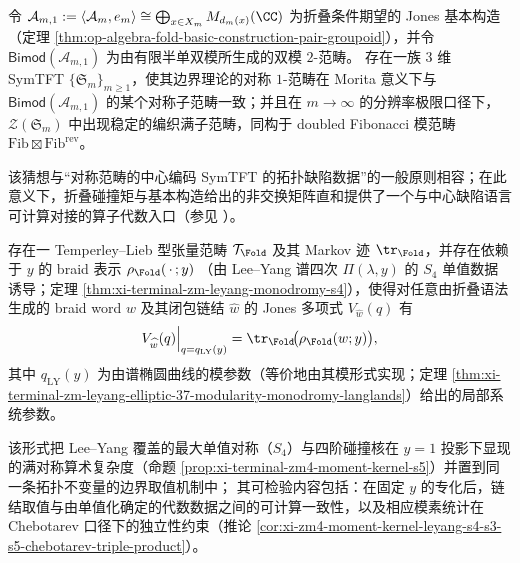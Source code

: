 \begin{conjecture}\label{conj:pom-fold-jones-tower-symtft-doubled-fib}
令 \(\mathcal A_{m,1}:=\langle \mathcal A_m,e_m\rangle\cong \bigoplus_{x\in X_m}M_{d_m(x)}(\CC)\) 为折叠条件期望的 Jones 基本构造（定理 \ref{thm:op-algebra-fold-basic-construction-pair-groupoid}），并令 \(\mathsf{Bimod}(\mathcal A_{m,1})\) 为由有限半单双模所生成的双模 \(2\)-范畴。
存在一族 \(3\) 维 SymTFT \(\{\mathfrak S_m\}_{m\ge 1}\)，使其边界理论的对称 \(1\)-范畴在 Morita 意义下与 \(\mathsf{Bimod}(\mathcal A_{m,1})\) 的某个对称子范畴一致；并且在 \(m\to\infty\) 的分辨率极限口径下，\(\mathcal Z(\mathfrak S_m)\) 中出现稳定的编织满子范畴，同构于 doubled Fibonacci 模范畴 \(\mathrm{Fib}\boxtimes \mathrm{Fib}^{\mathrm{rev}}\)。
\end{conjecture}

\begin{remark}
该猜想与“对称范畴的中心编码 SymTFT 的拓扑缺陷数据”的一般原则相容；在此意义下，折叠碰撞矩与基本构造给出的非交换矩阵直和提供了一个与中心缺陷语言可计算对接的算子代数入口（参见 \cite{BhardwajSchaferNameki2025GeneralizedChargesII}）。
\end{remark}

\begin{conjecture}\label{conj:pom-fold-leyang-jones-boundary-value}
存在一 Temperley--Lieb 型张量范畴 \(\mathcal T_{\Fold}\) 及其 Markov 迹 \(\tr_{\Fold}\)，并存在依赖于 \(y\) 的 braid 表示
\(
\rho_{\Fold}(\,\cdot\,;y)
\)
（由 Lee--Yang 谱四次 \(\Pi(\lambda,y)\) 的 \(S_4\) 单值数据诱导；定理 \ref{thm:xi-terminal-zm-leyang-monodromy-s4}），使得对任意由折叠语法生成的 braid word \(w\) 及其闭包链结 \(\widehat w\) 的 Jones 多项式 \(V_{\widehat w}(q)\) 有
\[
V_{\widehat w}(q)\Big|_{q=q_{\mathrm{LY}}(y)}
=\tr_{\Fold}\!\bigl(\rho_{\Fold}(w;y)\bigr),
\]
其中 \(q_{\mathrm{LY}}(y)\) 为由谱椭圆曲线的模参数（等价地由其模形式实现；定理 \ref{thm:xi-terminal-zm-leyang-elliptic-37-modularity-monodromy-langlands}）给出的局部系统参数。
\end{conjecture}

\begin{remark}
该形式把 Lee--Yang 覆盖的最大单值对称（\(S_4\)）与四阶碰撞核在 \(y=1\) 投影下显现的满对称算术复杂度（命题 \ref{prop:xi-terminal-zm4-moment-kernel-s5}）并置到同一条拓扑不变量的边界取值机制中；
其可检验内容包括：在固定 \(y\) 的专化后，链结取值与由单值化确定的代数数据之间的可计算一致性，以及相应模素统计在 Chebotarev 口径下的独立性约束（推论 \ref{cor:xi-zm4-moment-kernel-leyang-s4-s3-s5-chebotarev-triple-product}）。
\end{remark}
